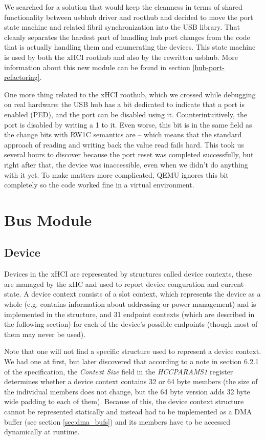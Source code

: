 We searched for a solution that would keep the cleanness in terms of shared
functionality between usbhub driver and roothub and decided to move the port
state machine and related fibril synchronization into the USB library. That
cleanly separates the hardest part of handling hub port changes from the code
that is actually handling them and enumerating the devices. This state machine
is used by both the xHCI roothub and also by the rewritten usbhub. More
information about this new module can be found in section \ref{hub-port-refactoring}.

One more thing related to the xHCI roothub, which we crossed while debugging on
real hardware: the USB hub has a bit dedicated to indicate that a port is
enabled (PED), and the port can be disabled using it. Counterintuitively, the
port is disabled by writing a 1 to it. Even worse, this bit is in the same
field as the change bits with RW1C semantics are -- which means that the
standard approach of reading and writing back the value read fails hard. This
took us several hours to discover because the port reset was completed
successfully, but right after that, the device was inaccessible, even when we
didn't do anything with it yet. To make matters more complicated, QEMU ignores
this bit completely so the code worked fine in a virtual environment.

\section{Bus Module}


\subsection{Device}

Devices in the xHCI are represented by structures called device contexts, these are
managed by the xHC and used to report device conguration and current state. A device
context consists of a slot context, which represents the device as a whole (e.g. contains
information about addressing or power management) and is implemented in the 
structure, and 31 endpoint contexts (which are described in the following section)
for each of the device's possible endpoints (though most of them may never be used).

Note that one will not find a specific structure used to represent a device context. We had
one at first, but later discovered that according to a note in section 6.2.1 of the
specification, the \textit{Context Size} field in the \textit{HCCPARAMS1} register determines whether
a device context contains 32 or 64 byte members (the size of the individual members does
not change, but the 64 byte version adds 32 byte wide padding to each of them). Because
of this, the device context structure cannot be represented statically and instead had to be
implemented as a DMA buffer (see section \ref{sec:dma_bufs}) and its members have to
be accessed dynamically at runtime.

